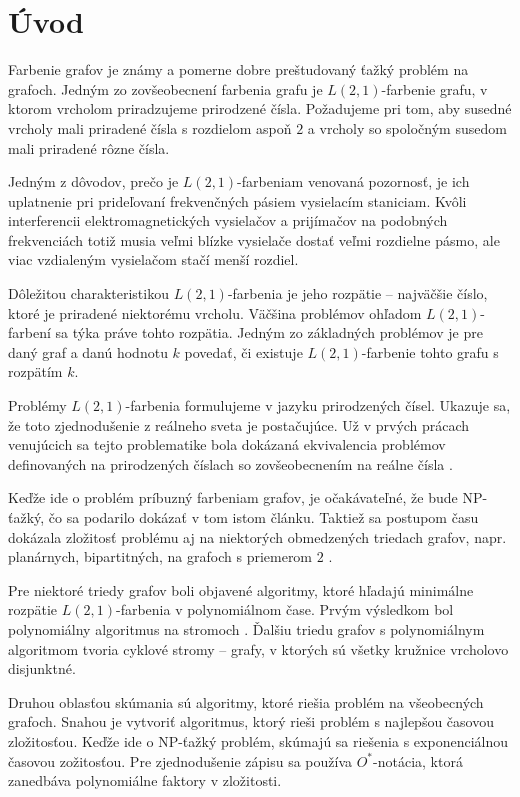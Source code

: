 \chapter*{Úvod} %

Farbenie grafov je známy a pomerne dobre preštudovaný ťažký problém na grafoch.
Jedným zo zovšeobecnení farbenia grafu je $L(2,1)$-farbenie grafu, v ktorom
vrcholom priradzujeme prirodzené čísla. Požadujeme pri tom, aby susedné
vrcholy mali priradené čísla s rozdielom aspoň $2$ a vrcholy so spoločným
susedom mali priradené rôzne čísla.

Jedným z dôvodov, prečo je $L(2,1)$-farbeniam venovaná pozornosť, je ich uplatnenie
pri prideľovaní frekvenčných pásiem vysielacím staniciam. Kvôli interferencii
elektromagnetických vysielačov a prijímačov na podobných frekvenciách totiž
musia veľmi blízke vysielače dostať veľmi rozdielne pásmo, ale viac vzdialeným
vysielačom stačí menší rozdiel.

Dôležitou charakteristikou $L(2,1)$-farbenia
je jeho rozpätie -- najväčšie číslo, ktoré je priradené niektorému vrcholu. Väčšina
problémov ohľadom $L(2,1)$-farbení sa týka práve tohto rozpätia. Jedným zo základných
problémov je pre daný graf a danú hodnotu $k$ povedať, či existuje $L(2,1)$-farbenie
tohto grafu s rozpätím $k$.

Problémy $L(2,1)$-farbenia formulujeme v jazyku prirodzených čísel. Ukazuje sa,
že toto zjednodušenie z reálneho sveta je postačujúce. Už v prvých prácach venujúcich sa tejto problematike
bola dokázaná ekvivalencia problémov definovaných na prirodzených číslach
so zovšeobecnením na reálne čísla \cite{griggs_yeh_tree}.

Keďže ide o problém príbuzný farbeniam grafov, je očakávateľné, že
bude NP-ťažký, čo sa podarilo dokázať v tom istom článku.
Taktiež sa postupom času dokázala zložitosť problému aj na niektorých obmedzených
triedach grafov, napr. planárnych, bipartitných, na grafoch s
priemerom $2$ \cite{color_survey}.

Pre niektoré triedy grafov boli objavené algoritmy, ktoré hľadajú minimálne rozpätie
$L(2,1)$-farbenia v polynomiálnom čase. Prvým výsledkom bol polynomiálny algoritmus
na stromoch \cite{chang_kuo}. Ďalšiu triedu grafov s polynomiálnym algoritmom tvoria
cyklové stromy \cite{kaktusy} -- grafy, v ktorých sú všetky kružnice vrcholovo disjunktné.

Druhou oblasťou skúmania sú algoritmy, ktoré riešia problém na všeobecných grafoch. Snahou
je vytvoriť algoritmus, ktorý rieši problém s najlepšou časovou zložitosťou. Keďže
ide o NP-ťažký problém, skúmajú sa riešenia s exponenciálnou časovou zožitosťou. Pre
zjednodušenie zápisu sa používa $O^*$-notácia, ktorá zanedbáva polynomiálne faktory v zložitosti.

